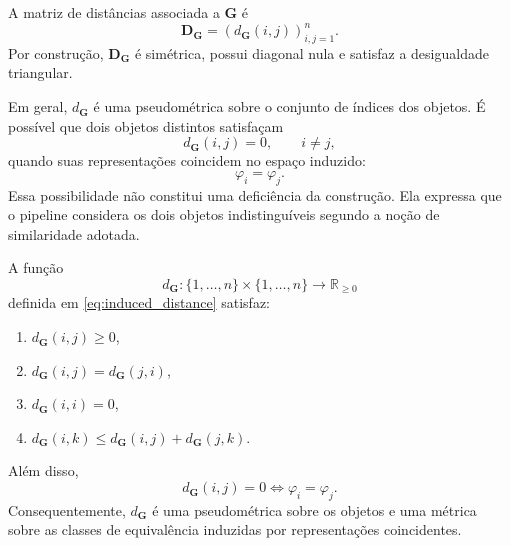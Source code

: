 A matriz de distâncias associada a $\mathbf{G}$ é
\begin{equation}\label{eq:distance_matrix}
    \mathbf{D}_{\mathbf{G}}
    =
    \left(
        d_{\mathbf{G}}(i,j)
    \right)_{i,j=1}^{n}.
\end{equation}
Por construção, $\mathbf{D}_{\mathbf{G}}$ é simétrica, possui diagonal
nula e satisfaz a desigualdade triangular.

Em geral, $d_{\mathbf{G}}$ é uma pseudométrica sobre o conjunto de índices
dos objetos. É possível que dois objetos distintos satisfaçam
\begin{equation}\label{eq:zero_pseudodistance}
    d_{\mathbf{G}}(i,j)
    =
    0,
    \qquad
    i\neq j,
\end{equation}
quando suas representações coincidem no espaço induzido:
\begin{equation*}
    \varphi_i
    =
    \varphi_j.
\end{equation*}
Essa possibilidade não constitui uma deficiência da construção. Ela
expressa que o pipeline considera os dois objetos indistinguíveis segundo
a noção de similaridade adotada.

\begin{proposition}
\label{prop:induced_pseudometric}
A função
\begin{equation*}
    d_{\mathbf{G}}:
    \{1,\dots,n\}
    \times
    \{1,\dots,n\}
    \longrightarrow
    \mathbb{R}_{\geq 0}
\end{equation*}
definida em \eqref{eq:induced_distance} satisfaz:
\begin{enumerate}
    \item $d_{\mathbf{G}}(i,j)\geq 0$,
    \item $d_{\mathbf{G}}(i,j)=d_{\mathbf{G}}(j,i)$,
    \item $d_{\mathbf{G}}(i,i)=0$,
    \item $d_{\mathbf{G}}(i,k) \leq d_{\mathbf{G}}(i,j) + d_{\mathbf{G}}(j,k)$.

\end{enumerate}
Além disso,
\begin{equation}
    d_{\mathbf{G}}(i,j)
    =
    0
    \iff
    \varphi_i
    =
    \varphi_j.
\end{equation}
Consequentemente, $d_{\mathbf{G}}$ é uma pseudométrica sobre os objetos e
uma métrica sobre as classes de equivalência induzidas por representações
coincidentes.
\end{proposition}


